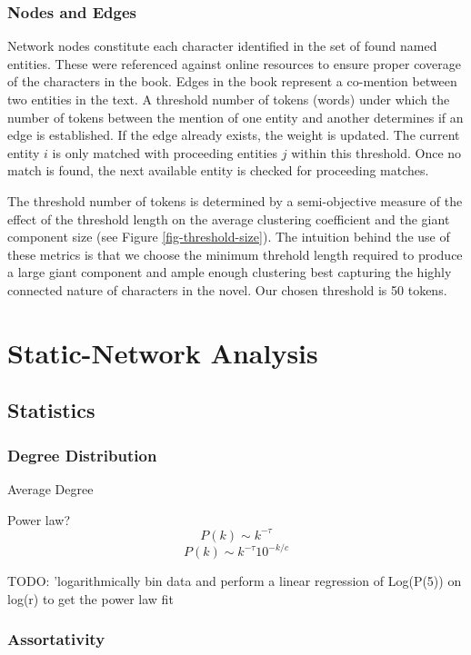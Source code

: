 \documentclass[sigconf]{acmart}
\begin{document}
\subsubsection{Nodes and Edges}
Network nodes constitute each character identified in the set of found named entities. These were referenced against online resources to ensure proper coverage of the characters in the book. Edges in the book represent a co-mention between two entities in the text. A threshold number of tokens (words) under which the number of tokens between the mention of one entity and another determines if an edge is established. If the edge already exists, the weight is updated. The current entity $i$ is only matched with proceeding entities $j$ within this threshold. Once no match is found, the next available entity is checked for proceeding matches.

The threshold number of tokens is determined by a semi-objective measure of the effect of the threshold length on the average clustering coefficient and the giant component size (see Figure \ref{fig-threshold-size}). The intuition behind the use of these metrics is that we choose the minimum threhold length required to produce a large giant component and ample enough clustering best capturing the highly connected nature of characters in the novel. Our chosen threshold is 50 tokens.

\section{Static-Network Analysis}

\subsection{Statistics}

\subsubsection{Degree Distribution}
Average Degree

Power law? 
$$P(k) \sim k^{-\tau}$$
$$P(k) \sim k^{-\tau}10^{-k/c}$$

TODO: 'logarithmically bin data and perform a linear regression of Log(P(5)) on log(r) to get the power law fit

\subsubsection{Assortativity}
\end{document}

